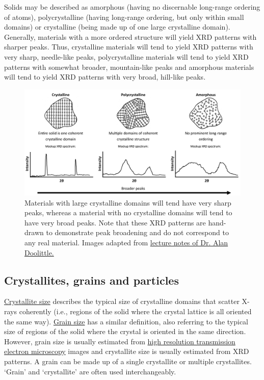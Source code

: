 \documentclass[letterpaper, 12pt]{article}
\begin{document}
Solids may be described as amorphous (having no discernable long-range ordering of atoms), polycrystalline (having long-range ordering, but only within small domains) or crystalline (being made up of one large crystalline domain). Generally, materials with a more ordered structure will yield XRD patterns with sharper peaks. Thus, crystalline materials will tend to yield XRD patterns with very sharp, needle-like peaks, polycrystalline materials will tend to yield XRD patterns with somewhat broader, mountain-like peaks and amorphous materials will tend to yield XRD patterns with very broad, hill-like peaks.

\begin{figure}[h!tbp]
    \includegraphics[width=\textwidth]{img/xrd/xrd_mockup.jpg}
    \caption*{ Materials with large crystalline domains will tend have very sharp peaks, whereas a material with no crystalline domains will tend to have very broad peaks. Note that these XRD patterns are hand-drawn to demonstrate peak broadening and do not correspond to any real material. Images adapted from \href{https://alan.ece.gatech.edu/ECE3040/Lectures/Lecture1-ElectronicMaterialsPierretChap1and2.pdf}{lecture notes of Dr. Alan Doolittle.}}
\end{figure}

\subsection*{Crystallites, grains and particles}

\href{https://www.eng.uc.edu/~beaucag/Classes/Properties%20of%20Materials/MITCrystalSizeAnalysis.pdf}{Crystallite size} describes the typical size of crystalline domains that scatter X-rays coherently (i.e., regions of the solid where the crystal lattice is all oriented the same way). \href{https://doi.org/10.1088/0957-4484/21/14/145701}{Grain size} has a similar definition, also referring to the typical size of regions of the solid where the crystal is oriented in the same direction. However, grain size is usually estimated from \href{https://en.wikipedia.org/wiki/High-resolution_transmission_electron_microscopy}{high resolution transmission electron microscopy} images and crystallite size is usually estimated from XRD patterns. A grain can be made up of a single crystallite or multiple crystallites. `Grain' and `crystallite' are often used interchangeably.
\end{document}
